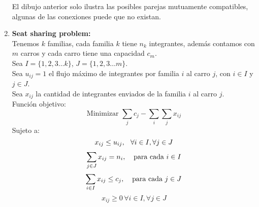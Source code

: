 \documentclass[a4paper, 12pt]{article}
\begin{document}
\begin{enumerate}
\begin{center}
            \end{center}

            El dibujo anterior solo ilustra las posibles parejas mutuamente compatibles, algunas de las conexiones puede que no existan.




      \item {\bfseries Seat sharing problem: }
            \\ Tenemos $k$ familias, cada familia $k$ tiene $n_k$ integrantes, además contamos con $m$ carros y cada carro tiene una capacidad $c_m$.
            \\ Sea $I = \{1,2,3 \dots k\}$, $J = \{1,2,3 \dots m\}$.
            \\ Sea $u_{ij} = 1$ el flujo máximo de integrantes por familia $i$ al carro $j$, con $i \in I$ y $j \in J$.
            \\ Sea $x_{ij}$ la cantidad de integrantes enviados de la familia $i$ al carro $j$.
            \\ Función objetivo:
            \[ \text{Minimizar }   \sum_{j}  {c_{j}} - \sum_{i} \sum_j {x_{ij}}\]
            Sujeto a:
            \[ x_{ij} \leq u_{ij}, \hspace{0.1in} \forall i \in I, \forall j \in J \]
            \[ \sum_{j \in J} {x_{ij}} = n_i, \hspace{0.1 in} \text{ para cada } i \in I \]
            \[ \sum_{i \in I} {x_{ij}} \leq c_j, \hspace{0.1 in} \text{ para cada } j \in J \]
            \[x_{ij} \geq 0 \, \forall i \in I,\forall j \in J\]
            \begin{center}
\end{center}
\end{enumerate}
\end{document}
